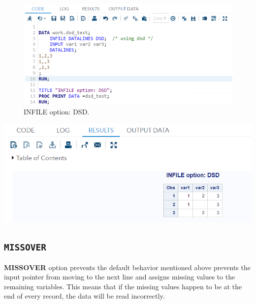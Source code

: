 \documentclass[
]{book}
\begin{document}
\begin{figure}

{\centering \includegraphics[width=1\linewidth]{img04/w04-InfileOptionDSD} 

}

\caption{INFILE option: DSD.}\label{fig:unnamed-chunk-28}
\end{figure}

\begin{center}\includegraphics[width=1\linewidth]{img04/w04-dsd-output} \end{center}

\hypertarget{missover}{%
\subsection{\texorpdfstring{\texttt{MISSOVER}}{MISSOVER}}\label{missover}}

\textbf{MISSOVER} option prevents the default behavior mentioned above prevents the input pointer from moving to the next line and assigns missing values to the remaining variables. This means that if the missing values happen to be at the end of every record, the data will be read incorrectly.
\end{document}
